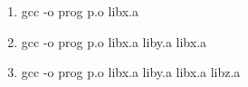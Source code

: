 \documentclass{article}
\begin{document}
\begin{enumerate}[label=\textbf{\Alph*.}]
	\item gcc -o prog p.o libx.a
	\item gcc -o prog p.o libx.a liby.a libx.a
	\item gcc -o prog p.o libx.a liby.a libx.a libz.a
\end{enumerate}
\end{document}
